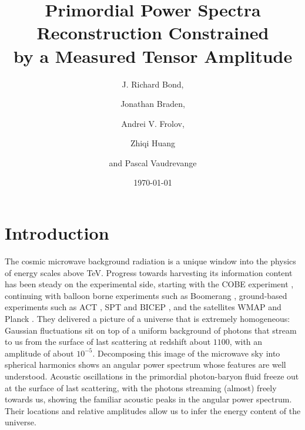 \documentclass[a4paper,11pt]{article}
\begin{document}
\title{Primordial Power Spectra Reconstruction Constrained\\ by a Measured Tensor Amplitude}
\author[a]{J. Richard Bond,}
\author[a,b]{Jonathan Braden,}
\author[c]{Andrei V. Frolov,}
\author[a]{Zhiqi Huang}
\author[d]{and Pascal Vaudrevange}




\date{\today}
\maketitle
\flushbottom

\section{Introduction}

The cosmic microwave background radiation is a unique window into the physics of energy scales above TeV. Progress towards harvesting its information content has been steady on the experimental side, starting with the COBE experiment \cite{COBE1996}, continuing with balloon borne experiments such as Boomerang \cite{Boomerang2001, Boomerang2003}, ground-based experiments such as ACT \cite{ACT2013, ACT2014}, SPT \cite{SPT2013, SPT2014} and BICEP \cite{BICEP2}, and the satellites WMAP \cite{WMAP9Maps, WMAP9Cosmology} and Planck \cite{Planck2013Overview, Planck2013PowerSpectra, Planck2013Parameters}. They delivered a picture of a universe that is extremely homogeneous: Gaussian fluctuations sit on top of a uniform background of photons that stream to us from the surface of last scattering at redshift about $1100$, with an amplitude of about $10^{-5}$. Decomposing this image of the microwave sky into spherical harmonics shows an angular power spectrum whose features are well understood. Acoustic oscillations in the primordial photon-baryon fluid freeze out at the surface of last scattering, with the photons streaming (almost) freely towards us, showing the familiar acoustic peaks in the angular power spectrum. Their locations and relative amplitudes allow us to infer the energy content of the universe.
\end{document}
